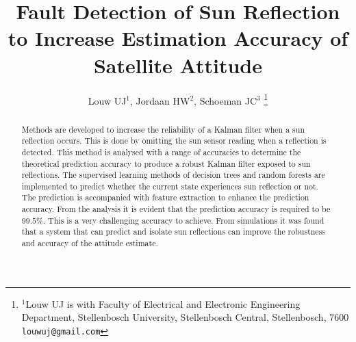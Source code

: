 \documentclass[letterpaper, 10 pt, conference]{ieeeconf}  %
\title{\LARGE \bf
Fault Detection of Sun Reflection to Increase Estimation Accuracy of Satellite Attitude
}
\author{Louw UJ$^{1}$, Jordaan HW$^{2}$, Schoeman JC$^{3}$%
\thanks{$^{1}$Louw UJ is with Faculty of Electrical and Electronic Engineering Department, Stellenbosch University, Stellenbosch Central, Stellenbosch, 7600
        {\tt\small louwuj@gmail.com}}%
}
\begin{document}
\maketitle
\thispagestyle{empty}
\pagestyle{empty}


\begin{abstract}
	
Methods are developed to increase the reliability of a Kalman filter when a sun reflection occurs. This is done by omitting the sun sensor reading when a reflection is detected. This method is analysed with a range of accuracies to determine the theoretical prediction accuracy to produce a robust Kalman filter exposed to sun reflections. The supervised learning methods of decision trees and random forests are implemented to predict whether the current state experiences sun reflection or not. The prediction is accompanied with feature extraction to enhance the prediction accuracy. From the analysis it is evident that the prediction accuracy is required to be $99.5\%$. This is a very challenging accuracy to achieve. From simulations it was found that a system that can predict and isolate sun reflections can improve the robustness and accuracy of the attitude estimate.



\end{abstract}
\end{document}
